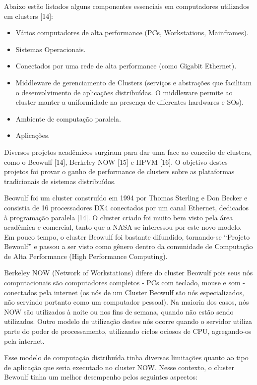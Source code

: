 Abaixo estão listados alguns componentes essenciais em computadores utilizados em clusters [14]:

\begin{itemize}
    \item Vários computadores de alta performance (PCs, Workstations, Mainframes).
    \item Sistemas Operacionais.
    \item Conectados por uma rede de alta performance (como Gigabit Ethernet).
    \item Middleware de gerenciamento de Clusters (serviços e abstrações que facilitam o desenvolvimento de aplicações distribuídas. O middleware permite ao cluster manter a uniformidade na presença de diferentes hardwares e SOs).
    \item Ambiente de computação paralela.
    \item Aplicações.
\end{itemize}
Diversos projetos acadêmicos surgiram para dar uma face ao conceito de clusters, como o Beowulf [14], Berkeley NOW [15] e HPVM [16]. O objetivo destes projetos foi provar o ganho de performance de clusters sobre as plataformas tradicionais de sistemas distribuídos. 

Beowulf foi um cluster construído em 1994 por Thomas Sterling e Don Becker e consistia de 16 processadores DX4 conectados por um canal Ethernet, dedicados à programação paralela [14]. O cluster criado foi muito bem visto pela área acadêmica e comercial, tanto que a NASA se interessou por este novo modelo. Em pouco tempo, o cluster Beowulf foi bastante difundido, tornando-se “Projeto Bewoulf” e passou a ser visto como gênero dentro da comunidade de Computação de Alta Performance (High Performance Computing).

Berkeley NOW (Network of Workstations) difere do cluster Beowulf pois seus nós computacionais são computadores completos - PCs com teclado, mouse e som - conectados pela internet (os nós de um Cluster Beowulf são nós especializados, não servindo portanto como um computador pessoal). Na maioria dos casos, nós NOW são utilizados à noite ou nos fins de semana, quando não estão sendo utilizados. Outro modelo de utilização destes nós ocorre quando o servidor utiliza parte do poder de processamento, utilizando ciclos ociosos de CPU, agregando-os pela internet. 

Esse modelo de computação distribuída tinha diversas limitações quanto ao tipo de aplicação que seria executado no cluster NOW. Nesse contexto, o cluster Bewoulf tinha um melhor desempenho pelos seguintes aspectos: 


